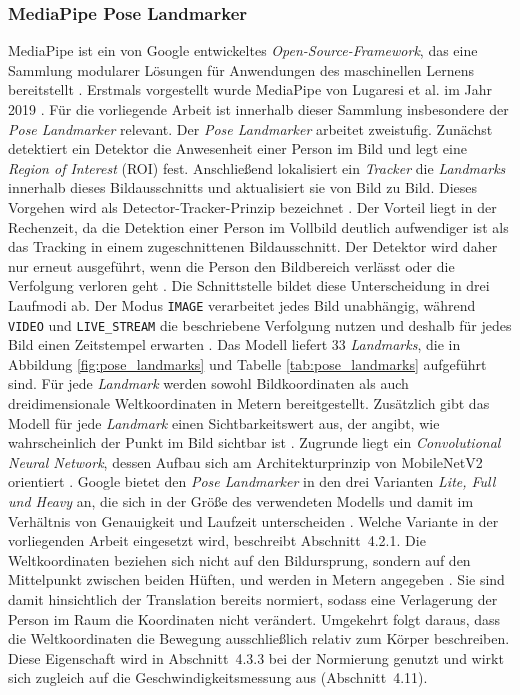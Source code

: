 \documentclass[intern]{cgMA}
\begin{document}
\subsubsection{MediaPipe Pose Landmarker}
MediaPipe ist ein von Google entwickeltes \textit{Open-Source-Framework}, das eine Sammlung modularer Lösungen für Anwendungen des maschinellen Lernens bereitstellt \cite{MediaPipeTasks}. Erstmals vorgestellt wurde MediaPipe von Lugaresi et al. im Jahr 2019 \cite{Lugaresi2019}. Für die vorliegende Arbeit ist innerhalb dieser Sammlung insbesondere der \textit{Pose Landmarker} relevant. 
Der \textit{Pose Landmarker} arbeitet zweistufig. Zunächst detektiert ein Detektor die Anwesenheit einer Person im Bild und legt eine \textit{Region of Interest} (ROI) fest. Anschließend lokalisiert ein \textit{
Tracker} die \textit{Landmarks} innerhalb dieses Bildausschnitts und aktualisiert sie von Bild zu Bild. Dieses Vorgehen wird als Detector-Tracker-Prinzip bezeichnet \cite{Bazarevsky2020}. Der Vorteil liegt in der Rechenzeit, da die Detektion einer Person im Vollbild deutlich aufwendiger ist als das Tracking in einem zugeschnittenen Bildausschnitt. Der Detektor wird daher nur erneut ausgeführt, wenn die Person den Bildbereich verlässt oder die Verfolgung verloren geht \cite{Bazarevsky2020}.
Die Schnittstelle bildet diese Unterscheidung in drei Laufmodi ab. Der Modus \texttt{IMAGE} verarbeitet jedes Bild unabhängig, während \texttt{VIDEO} und \texttt{LIVE\_STREAM} die beschriebene Verfolgung nutzen und deshalb für jedes Bild einen Zeitstempel erwarten \cite{mediapipepose}.
Das Modell liefert 33 \textit{Landmarks}, die in Abbildung \ref{fig:pose_landmarks} und Tabelle \ref{tab:pose_landmarks} aufgeführt sind. Für jede \textit{Landmark} werden sowohl Bildkoordinaten als auch dreidimensionale Weltkoordinaten in Metern bereitgestellt. Zusätzlich gibt das Modell für jede \textit{Landmark} einen Sichtbarkeitswert aus, der angibt, wie wahrscheinlich der Punkt im Bild sichtbar ist \cite{mediapipepose}. Zugrunde liegt ein \textit{Convolutional Neural Network}, dessen Aufbau sich am Architekturprinzip von MobileNetV2 orientiert \cite{mobilenetv2, mediapipepose}.
Google bietet den \textit{Pose Landmarker} in den drei Varianten \textit{Lite, Full und Heavy} an, die sich in der Größe des verwendeten Modells und damit im Verhältnis von Genauigkeit und Laufzeit unterscheiden \cite{mediapipepose}. Welche Variante in der vorliegenden Arbeit eingesetzt wird, beschreibt Abschnitt~4.2.1.
Die Weltkoordinaten beziehen sich nicht auf den Bildursprung, sondern auf den Mittelpunkt zwischen beiden Hüften, und werden in Metern angegeben \cite{mediapipepose}. Sie sind damit hinsichtlich der Translation bereits normiert, sodass eine Verlagerung der Person im Raum die Koordinaten nicht verändert. Umgekehrt folgt daraus, dass die Weltkoordinaten die Bewegung ausschließlich relativ zum Körper beschreiben. Diese Eigenschaft wird in Abschnitt~4.3.3 bei der Normierung genutzt und wirkt sich zugleich auf die Geschwindigkeitsmessung aus (Abschnitt~4.11).
\end{document}
